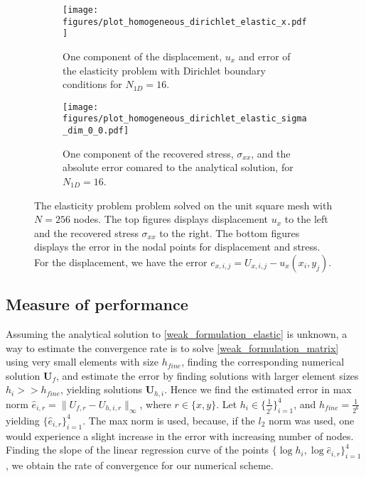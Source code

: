 \documentclass[5pt,a4paper,english]{elsarticle}%
\begin{document}
\begin{figure}[ht]   
    \begin{subfigure}[b]{0.5\textwidth}
        \centering
            \texttt{[image: figures/plot\_homogeneous\_dirichlet\_elastic\_x.pdf]}
            \caption{One component of the displacement, $u_x$ and error of the elasticity problem with Dirichlet boundary conditions for $N_{1D} = 16$.}
        \label{solution-error-dirichlet-elastic-x}
    \end{subfigure}\qquad
    \begin{subfigure}[b]{0.5\textwidth}
        \centering
            \texttt{[image: figures/plot\_homogeneous\_dirichlet\_elastic\_sigma\_dim\_0\_0.pdf]}
            \caption{One component of the recovered stress, $\sigma_{xx}$, and the absolute error comared to the analytical solution, for $N_{1D} = 16$.}
        \label{solution-error-dirichlet-elastic-sigma-xx}
    \end{subfigure}

    \caption{The elasticity problem problem solved on the unit square mesh with $N = 256$ nodes. The top figures displays displacement $u_x$ to the left and the recovered stress $\sigma_{xx}$ to the right. The bottom figures displays the error in the nodal points for displacement and stress. For the displacement, we have the error $e_{x,i,j} = U_{x,i,j} - u_x(x_i,y_j)$.}
\end{figure}

\subsection{Measure of performance}

Assuming the analytical solution to \eqref{weak_formulation_elastic} is unknown, a way to estimate the convergence rate is to solve \eqref{weak_formulation_matrix} using very small elements with size $h_{fine}$, finding the corresponding numerical solution $\bm U_f$, and estimate the error by finding solutions with larger element sizes $h_i >> h_{fine}$, yielding solutions $\bm U_{h,i}$. Hence we find the estimated error in max norm $\hat e_{i,r} = \|U_{f,r} - U_{h,i,r} \|_{\infty}$, where $r\in \{x,y\}$. Let $h_i \in \{\frac{1}{2^i}\}_{i=1}^4$, and $h_{fine} = \frac{1}{2^6}$ yielding $\{\hat e_{i,r}\}_{i=1}^4$. The max norm is used, because, if the $l_2$ norm was used, one would experience a slight increase in the error with increasing number of nodes. Finding the slope of the linear regression curve of the points $\{\log h_i,\log  \hat e_{i,r}\}_{i=1}^4$, we obtain the rate of convergence for our numerical scheme. 
\end{document}
